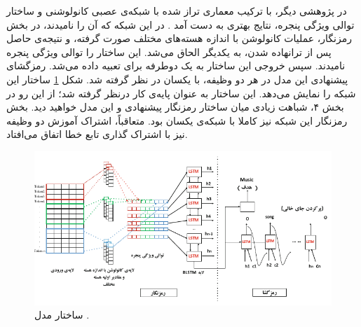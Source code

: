 در پژوهشی دیگر، با ترکیب معماری  تراز شده با شبکه‌ی عصبی کانولوشنی و ساختار توالی ویژگی پنجره، نتایج بهتری به دست آمد \cite{Wang:18}. در این شبکه که آن را  نامیدند، در بخش رمزنگار، عملیات کانولوشن با اندازه هسته‌های مختلف صورت گرفته، و نتیجه‌ی حاصل پس از ترانهاده شدن، به یکدیگر الحاق می‌شد. این ساختار را توالی ویژگی پنجره نامیدند. سپس خروجی این ساختار به یک  دوطرفه برای تعبیه داده می‌شد. رمزگشای پیشنهادی این مدل در هر دو وظیفه، با  یکسان در نظر گرفته شد. شکل \ref{Fig:wang18} ساختار این شبکه را نمایش می‌دهد. این ساختار به عنوان پایه‌ی کار  درنظر گرفته شد؛ از این رو در بخش ۴، شباهت زیادی میان ساختار رمزنگار پیشنهادی و این مدل خواهید دید. بخش رمزنگار این شبکه نیز کاملا با شبکه‌ی \cite{aligned_lstm_atten_nlu} یکسان بود. متعاقباً، اشتراک آموزش دو وظیفه نیز با اشتراک گذاری تابع خطا اتفاق می‌افتاد.
\begin{figure}[!htb]
	\centering
	\includegraphics[scale=1.1]{Figures/cnnblstm.pdf}
	\caption[ساختار مدل ]{ساختار مدل  \cite{Wang:18}.}
	\label{Fig:wang18}
\end{figure}


